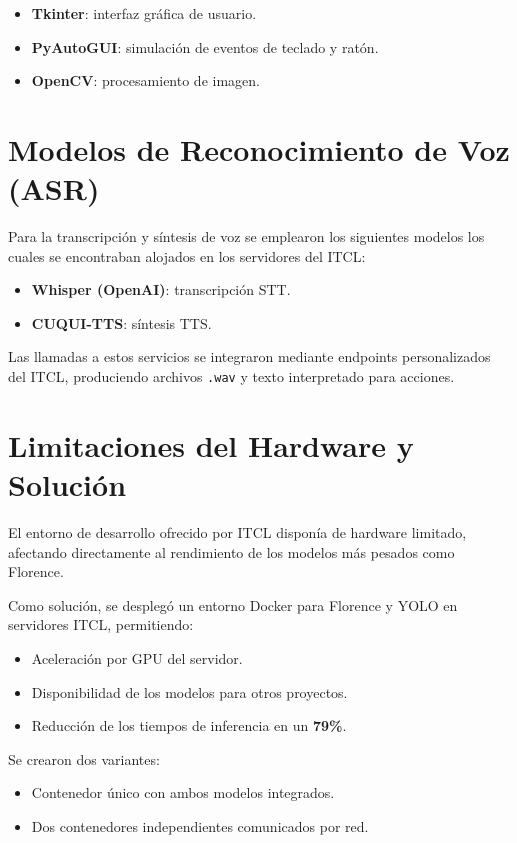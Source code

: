 \begin{itemize}
    \item \textbf{Tkinter}: interfaz gráfica de usuario.
    \item \textbf{PyAutoGUI}: simulación de eventos de teclado y ratón.
    \item \textbf{OpenCV}: procesamiento de imagen.
\end{itemize}

\section{Modelos de Reconocimiento de Voz (ASR)}

Para la transcripción y síntesis de voz se emplearon los siguientes modelos los cuales se encontraban alojados en los servidores del ITCL:

\begin{itemize}
    \item \textbf{Whisper (OpenAI)}: transcripción STT.
    \item \textbf{CUQUI-TTS}: síntesis TTS.
\end{itemize}

Las llamadas a estos servicios se integraron mediante endpoints personalizados del ITCL, produciendo archivos \texttt{.wav} y texto interpretado para acciones.

\section{Limitaciones del Hardware y Solución}

El entorno de desarrollo ofrecido por ITCL disponía de hardware limitado, afectando directamente al rendimiento de los modelos más pesados como Florence.

Como solución, se desplegó un entorno Docker para Florence y YOLO en servidores ITCL, permitiendo:

\begin{itemize}
    \item Aceleración por GPU del servidor.
    \item Disponibilidad de los modelos para otros proyectos.
    \item Reducción de los tiempos de inferencia en un \textbf{79\%}.
\end{itemize}

Se crearon dos variantes:
\begin{itemize}
    \item Contenedor único con ambos modelos integrados.
    \item Dos contenedores independientes comunicados por red.
\end{itemize}


